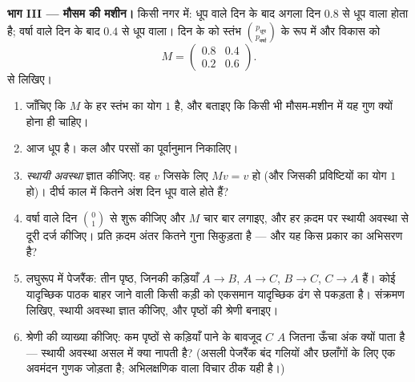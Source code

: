 \begin{problem}
\medskip
\noindent\textbf{भाग III --- मौसम की मशीन।}
किसी नगर में: धूप वाले दिन के बाद अगला दिन  $0.8$ से धूप वाला होता
है; वर्षा वाले दिन के बाद  $0.4$ से धूप वाला। दिन के  को स्तंभ
$\binom{p_{\text{धूप}}}{p_{\text{वर्षा}}}$ के रूप में और विकास को
\[
M = \begin{pmatrix} 0.8 & 0.4\\ 0.2 & 0.6 \end{pmatrix}.
\]
से लिखिए।
\begin{enumerate}[resume]
  \item जाँचिए कि $M$ के हर स्तंभ का योग $1$ है, और बताइए कि किसी भी
        मौसम-मशीन में यह गुण क्यों होना ही चाहिए।
  \item आज धूप है। कल और परसों का पूर्वानुमान निकालिए।
  \item \emph{स्थायी अवस्था} ज्ञात कीजिए: वह  $v$ जिसके लिए $Mv = v$ हो
        (और जिसकी प्रविष्टियों का योग $1$ हो)। दीर्घ काल में कितने अंश दिन
        धूप वाले होते हैं?
  \item वर्षा वाले दिन $\binom01$ से शुरू कीजिए और $M$ चार बार लगाइए, और हर
        क़दम पर स्थायी अवस्था से दूरी दर्ज कीजिए। प्रति क़दम अंतर कितने गुना
        सिकुड़ता है --- और यह किस प्रकार का अभिसरण है?
  \item लघुरूप में पेजरैंक: तीन पृष्ठ, जिनकी कड़ियाँ $A \to B$, $A \to C$, $B \to C$,
        $C \to A$ हैं। कोई यादृच्छिक पाठक बाहर जाने वाली किसी कड़ी को एकसमान
        यादृच्छिक ढंग से पकड़ता है। संक्रमण  लिखिए, स्थायी अवस्था ज्ञात
        कीजिए, और पृष्ठों की श्रेणी बनाइए।
  \item श्रेणी की व्याख्या कीजिए: कम पृष्ठों से कड़ियाँ पाने के बावजूद $C$
        $A$ जितना ऊँचा अंक क्यों पाता है --- स्थायी अवस्था असल में क्या
        नापती है? (असली पेजरैंक बंद गलियों और छलाँगों के लिए एक अवमंदन गुणक
        जोड़ता है; अभिलक्षणिक  वाला विचार ठीक यही है।)
\end{enumerate}


\end{problem}
